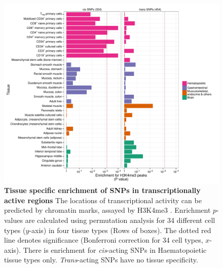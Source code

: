 \documentclass{article}
\begin{document}
\begin{figure}
	\centering
	\includegraphics[width=5in]{H3K4me3Enrichment501_list}
	\caption{\textbf{Tissue specific enrichment of SNPs in transcriptionally active regions} The locations of transcriptional activity can be predicted by chromatin marks, assayed by H3K4me3 \cite{Trynka2013}. Enrichment $p$-values are calculated using permutation analysis for 34 different cell types ($y$-axis) in four tissue types (Rows of boxes). The dotted red line denotes significance (Bonferroni correction for 34 cell types, $x$-axis). There is enrichment for \emph{cis}-acting SNPs in Haematopoietic tissue types only. \emph{Trans}-acting SNPs have no tissue specificity.}
	\label{fig:h3k4me3}
\end{figure}
\clearpage
\end{document}
